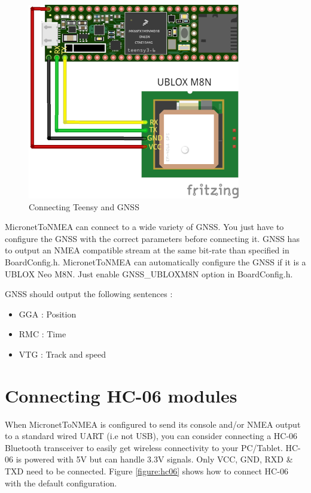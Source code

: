 \documentclass{report}
\begin{document}
\begin{figure}[h]
	\centering
	\includegraphics{MicronetToNMEA_GNSS.png}
	\caption{Connecting Teensy and GNSS}
	\label{figure:gnss}
\end{figure}

MicronetToNMEA can connect to a wide variety of GNSS. You just have to configure the GNSS with the correct parameters before connecting it. GNSS has to output an NMEA compatible stream at the same bit-rate than specified in BoardConfig.h. MicronetToNMEA can automatically configure the GNSS if it is a UBLOX Neo M8N. Just enable GNSS\_UBLOXM8N option in BoardConfig.h.

GNSS should output the following sentences :
\begin{itemize}
	\item GGA : Position
	\item RMC : Time
	\item VTG : Track and speed
\end{itemize}

\section{Connecting HC-06 modules}

When MicronetToNMEA is configured to send its console and/or NMEA output to a standard wired UART (i.e not USB), you can consider connecting a HC-06 Bluetooth transceiver to easily get wireless connectivity to your PC/Tablet. HC-06 is powered with 5V but can handle 3.3V signals. Only VCC, GND, RXD \& TXD need to be connected. Figure \ref{figure:hc06} shows how to connect HC-06 with the default configuration.
\end{document}
